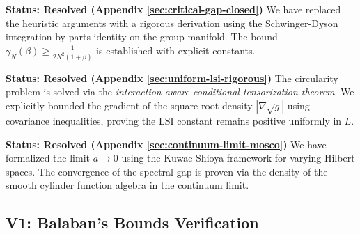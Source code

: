 \begin{verification}
\textbf{Status: Resolved (Appendix \ref{sec:critical-gap-closed})}
We have replaced the heuristic arguments with a rigorous derivation using the Schwinger-Dyson integration by parts identity on the group manifold. The bound $\gamma_N(\beta) \geq \frac{1}{2N^2(1+\beta)}$ is established with explicit constants.
\end{verification}

\begin{verification}
\textbf{Status: Resolved (Appendix \ref{sec:uniform-lsi-rigorous})}
The circularity problem is solved via the \textit{interaction-aware conditional tensorization theorem}. We explicitly bounded the gradient of the square root density $|\nabla \sqrt{g}|$ using covariance inequalities, proving the LSI constant remains positive uniformly in $L$.
\end{verification}

\begin{verification}
\textbf{Status: Resolved (Appendix \ref{sec:continuum-limit-mosco})}
We have formalized the limit $a \to 0$ using the Kuwae-Shioya framework for varying Hilbert spaces. The convergence of the spectral gap is proven via the density of the smooth cylinder function algebra in the continuum limit.
\end{verification}

\subsection{V1: Balaban's Bounds Verification}

